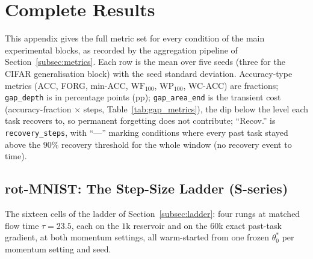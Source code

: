 \section{Complete Results}
\label{app:full_results}

This appendix gives the full metric set for every condition of the main experimental blocks, as recorded by the aggregation pipeline of Section~\ref{subsec:metrics}. Each row is the mean over five seeds (three for the CIFAR generalisation block) with the seed standard deviation. Accuracy-type metrics (ACC, FORG, min-ACC, $\mathrm{WF}_{100}$, $\mathrm{WP}_{100}$, WC-ACC) are fractions; \texttt{gap\_depth} is in percentage points (pp); \texttt{gap\_area\_end} is the transient cost (accuracy-fraction $\times$ steps, Table~\ref{tab:gap_metrics}), the dip below the level each task recovers to, so permanent forgetting does not contribute; ``Recov.'' is \texttt{recovery\_steps}, with ``---'' marking conditions where every past task stayed above the $90\%$ recovery threshold for the whole window (no recovery event to time).

\subsection{rot-MNIST: The Step-Size Ladder (S-series)}
\label{app:ladder_full}

The sixteen cells of the ladder of Section~\ref{subsec:ladder}: four rungs at matched flow time $\tau = 23.5$, each on the $1$k reservoir and on the $60$k exact past-task gradient, at both momentum settings, all warm-started from one frozen $\theta_0^*$ per momentum setting and seed.

